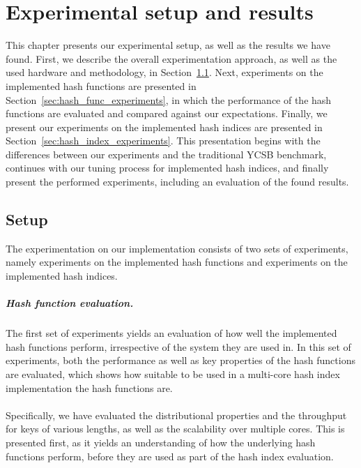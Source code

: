 \documentclass[11pt]{report} %
\begin{document}

\chapter{Experimental setup and results}
\label{chap:experiments}
This chapter presents our experimental setup, as well as the results we have found. First, we describe the overall experimentation approach, as well as the used hardware and methodology, in Section~\ref{sec:experiment_setup}. Next, experiments on the implemented hash functions are presented in Section~\ref{sec:hash_func_experiments}, in which the performance of the hash functions are evaluated and compared against our expectations. Finally, we present our experiments on the implemented hash indices are presented in Section~\ref{sec:hash_index_experiments}. This presentation begins with the differences between our experiments and the traditional YCSB benchmark, continues with our tuning process for implemented hash indices, and finally present the performed experiments, including an evaluation of the found results.

\section{Setup}
\label{sec:experiment_setup}
The experimentation on our implementation consists of two sets of experiments, namely experiments on the implemented hash functions and experiments on the implemented hash indices. 
\paragraph{Hash function evaluation.}
The first set of experiments yields an evaluation of how well the implemented hash functions perform, irrespective of the system they are used in. In this set of experiments, both the performance as well as key properties of the hash functions are evaluated, which shows how suitable to be used in a multi-core hash index implementation the hash functions are.\\
\\
Specifically, we have evaluated the distributional properties and the throughput for keys of various lengths, as well as the scalability over multiple cores. This is presented first, as it yields an understanding of how the underlying hash functions perform, before they are used as part of the hash index evaluation.
\end{document}
